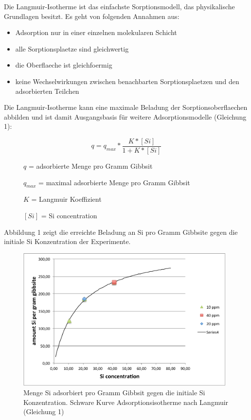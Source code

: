 \documentclass[12pt]{amsart}
\begin{document}
Die Langmuir-Isotherme ist das einfachste Sorptionsmodell, das physikalische Grundlagen besitzt. 
Es geht von folgenden Annahmen aus:

\begin{itemize}
\item Adsorption nur in einer einzelnen molekularen Schicht
\item alle Sorptionsplaetze sind gleichwertig
\item die Oberflaeche ist gleichfoermig 
\item keine Wechselwirkungen zwischen benachbarten Sorptionsplaetzen und den adsorbierten Teilchen
\end{itemize}

Die Langmuir-Isotherme kann eine maximale Beladung der Sorptionsoberflaechen abbilden und ist damit Ausgangsbasis für weitere Adsorptionsmodelle (Gleichung 1):

\begin{equation}
q=q_{max}*\frac{K*[Si]}{1+K*[Si]}
\label{eqn:langmuir}
\end{equation}

\begin{description}
\item[ ] $q$ = adsorbierte Menge pro Gramm Gibbsit
\item[ ] $q_{max}$ = maximal adsorbierte Menge pro Gramm Gibbsit
\item[ ]$K$ = Langmuir Koeffizient	
\item[ ]$[Si]$ = Si concentration
\end{description}

\bigskip

Abbildung 1 zeigt die erreichte Beladung an Si pro Gramm Gibbsite gegen die initiale Si Konzentration der Experimente.
\begin{figure}[htbp]
\begin{center}
\includegraphics[width=11cm]{figures/langmuir_fig.pdf}
\caption{Menge Si adsorbiert pro Gramm Gibbsit gegen die initiale Si Konzentration. Schware Kurve Adsorptionsisotherme nach Langmuir (Gleichung 1)}
\label{default}
\end{center}
\end{figure}
\end{document}
